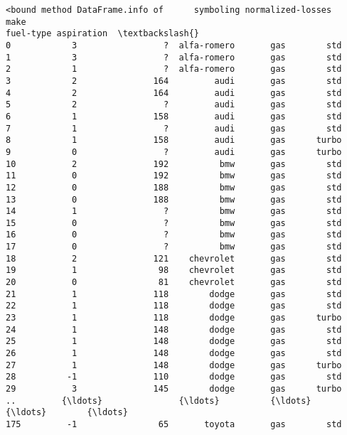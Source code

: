 \documentclass[11pt]{article}
\newcommand{\prompt}[4]{
        \llap{{\color{#2}[#3]: #4}}\vspace{-1.25em}
    }
\begin{document}
            \begin{tcolorbox}[breakable, boxrule=.5pt, size=fbox, pad at break*=1mm, opacityfill=0]
\prompt{Out}{outcolor}{19}{\hspace{3.5pt}}
\begin{Verbatim}[commandchars=\\\{\}]
<bound method DataFrame.info of      symboling normalized-losses         make
fuel-type aspiration  \textbackslash{}
0            3                 ?  alfa-romero       gas        std
1            3                 ?  alfa-romero       gas        std
2            1                 ?  alfa-romero       gas        std
3            2               164         audi       gas        std
4            2               164         audi       gas        std
5            2                 ?         audi       gas        std
6            1               158         audi       gas        std
7            1                 ?         audi       gas        std
8            1               158         audi       gas      turbo
9            0                 ?         audi       gas      turbo
10           2               192          bmw       gas        std
11           0               192          bmw       gas        std
12           0               188          bmw       gas        std
13           0               188          bmw       gas        std
14           1                 ?          bmw       gas        std
15           0                 ?          bmw       gas        std
16           0                 ?          bmw       gas        std
17           0                 ?          bmw       gas        std
18           2               121    chevrolet       gas        std
19           1                98    chevrolet       gas        std
20           0                81    chevrolet       gas        std
21           1               118        dodge       gas        std
22           1               118        dodge       gas        std
23           1               118        dodge       gas      turbo
24           1               148        dodge       gas        std
25           1               148        dodge       gas        std
26           1               148        dodge       gas        std
27           1               148        dodge       gas      turbo
28          -1               110        dodge       gas        std
29           3               145        dodge       gas      turbo
..         {\ldots}               {\ldots}          {\ldots}       {\ldots}        {\ldots}
175         -1                65       toyota       gas        std

\end{Verbatim}
\end{tcolorbox}
\end{document}
